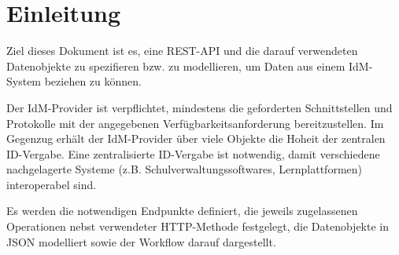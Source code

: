 \chapter{Einleitung}
Ziel dieses Dokument ist es, eine REST-API und die darauf verwendeten Datenobjekte zu spezifieren bzw. zu modellieren, um Daten aus einem IdM-System beziehen zu können.


Der IdM-Provider ist verpflichtet, mindestens die geforderten Schnittstellen und Protokolle mit der angegebenen Verfügbarkeitsanforderung bereitzustellen. 
Im Gegenzug erhält der IdM-Provider über viele Objekte die Hoheit der zentralen ID-Vergabe. 
Eine zentralisierte ID-Vergabe ist notwendig, damit verschiedene nachgelagerte Systeme (z.B. Schulverwaltungssoftwares, Lernplattformen) interoperabel sind.


Es werden die notwendigen Endpunkte definiert, die jeweils zugelassenen Operationen nebst verwendeter HTTP-Methode festgelegt, die Datenobjekte in JSON modelliert sowie der Workflow darauf dargestellt.


